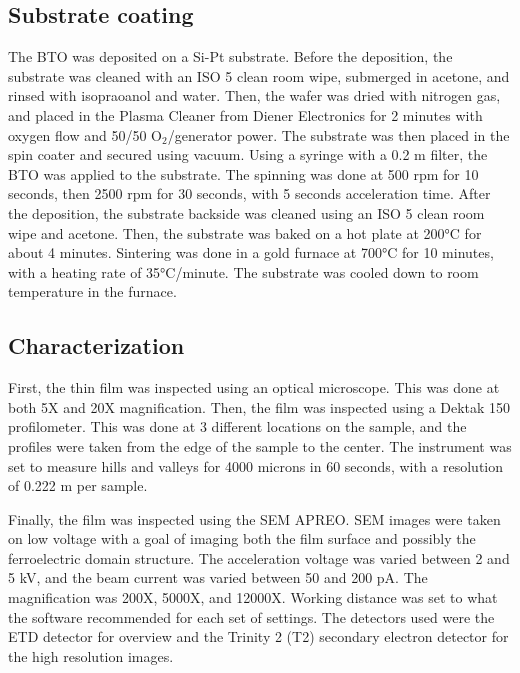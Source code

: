 \subsection{Substrate coating}

\noindent The BTO was deposited on a Si-Pt substrate.
Before the deposition, the substrate was cleaned with an ISO 5 clean room wipe, submerged in acetone, and rinsed with isopraoanol and water.
Then, the wafer was dried with nitrogen gas, and placed in the Plasma Cleaner from Diener Electronics for 2 minutes with oxygen flow and 50/50 O$_2$/generator power.
The substrate was then placed in the spin coater and secured using vacuum.
Using a syringe with a 0.2 \textmu m filter, the BTO was applied to the substrate.
The spinning was done at 500 rpm for 10 seconds, then 2500 rpm for 30 seconds, with 5 seconds acceleration time.
After the deposition, the substrate backside was cleaned using an ISO 5 clean room wipe and acetone.
Then, the substrate was baked on a hot plate at 200°C for about 4 minutes.
Sintering was done in a gold furnace at 700°C for 10 minutes, with a heating rate of 35°C/minute. %
The substrate was cooled down to room temperature in the furnace.


\subsection{Characterization}

\noindent First, the thin film was inspected using an optical microscope.
This was done at both 5X and 20X magnification.
Then, the film was inspected using a Dektak 150 profilometer.
This was done at 3 different locations on the sample, and the profiles were taken from the edge of the sample to the center.
The instrument was set to measure hills and valleys for 4000 microns in 60 seconds, with a resolution of 0.222 \textmu m per sample.

Finally, the film was inspected using the SEM APREO.
SEM images were taken on low voltage with a goal of imaging both the film surface and possibly the ferroelectric domain structure.
The acceleration voltage was varied between 2 and 5 kV, and the beam current was varied between 50 and 200 pA.
The magnification was 200X, 5000X, and 12000X.
Working distance was set to what the software recommended for each set of settings.
The detectors used were the ETD detector for overview and the Trinity 2 (T2) secondary electron detector for the high resolution images.
